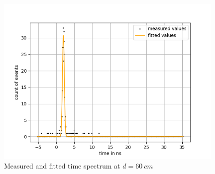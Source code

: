 \begin{figure}[H]
    \centering
    \includegraphics[width=110mm,scale=0.5]{Positronium/include/lightspeed fits6.png}
    \caption{Measured and fitted time spectrum at $d = \SI{60}{cm}$} 
   
\end{figure}